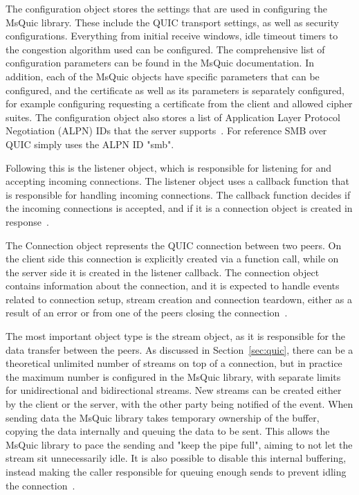 \documentclass[english, 12pt, a4paper, elec, utf8, a-2b, online]{aaltothesis}
\begin{document}
The configuration object stores the settings that are used in configuring the MsQuic
library. These include the QUIC transport settings, as well as security configurations. Everything
from initial receive windows, idle timeout timers to the congestion algorithm used
can be configured. The comprehensive list of configuration parameters can be found
in the MsQuic documentation. In addition, each of the MsQuic objects have specific
parameters that can be configured, and the certificate as well as its parameters
is separately configured, for example configuring requesting a certificate from the client
and allowed cipher suites. The configuration object also stores a list of
Application Layer Protocol Negotiation (ALPN) IDs that the server supports~\cite{msquic_docs}.
For reference SMB over QUIC simply uses the ALPN ID "smb".

Following this is the listener object, which is responsible for listening for
and accepting incoming connections. The listener object uses a callback function
that is responsible for handling incoming connections. The callback function decides
if the incoming connections is accepted, and if it is a connection object is created
in response~\cite{msquic_docs}.

The Connection object represents the QUIC connection between two peers. On the client
side this connection is explicitly created via a function call, while on the server
side it is created in the listener callback. The connection object contains information
about the connection, and it is expected to handle events related to connection setup,
stream creation and connection teardown, either as a result of an error or from one
of the peers closing the connection~\cite{msquic_docs}.

The most important object type is the stream object, as it is responsible for
the data transfer between the peers. As discussed in Section~\ref{sec:quic}, there
can be a theoretical unlimited number of streams on top of a connection, but in
practice the maximum number is configured in the MsQuic library, with separate
limits for unidirectional and bidirectional streams. New streams can be created
either by the client or the server, with the other party being notified of
the event. When sending data the MsQuic library takes temporary ownership of the
buffer, copying the data internally and queuing the data to be sent. This allows
the MsQuic library to pace the sending and "keep the pipe full", aiming to not let
the stream sit unnecessarily idle. It is also possible to disable this internal buffering,
instead making the caller responsible for queuing enough sends to prevent idling
the connection~\cite{msquic_docs}.
\end{document}
